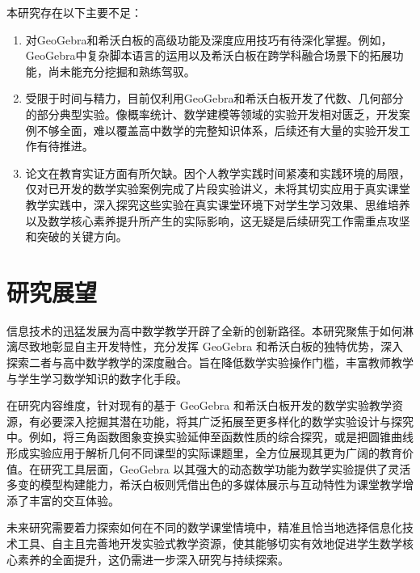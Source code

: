 本研究存在以下主要不足：
\begin{enumerate}[(1)]
  \item 对GeoGebra和希沃白板的高级功能及深度应用技巧有待深化掌握。例如，GeoGebra中复杂脚本语言的运用以及希沃白板在跨学科融合场景下的拓展功能，尚未能充分挖掘和熟练驾驭。
  \item 受限于时间与精力，目前仅利用GeoGebra和希沃白板开发了代数、几何部分的部分典型实验。像概率统计、数学建模等领域的实验开发相对匮乏，开发案例不够全面，难以覆盖高中数学的完整知识体系，后续还有大量的实验开发工作有待推进。
  \item 论文在教育实证方面有所欠缺。因个人教学实践时间紧凑和实践环境的局限，仅对已开发的数学实验案例完成了片段实验讲义，未将其切实应用于真实课堂教学实践中，深入探究这些实验在真实课堂环境下对学生学习效果、思维培养以及数学核心素养提升所产生的实际影响，这无疑是后续研究工作需重点攻坚和突破的关键方向。
\end{enumerate}


\section{研究展望}

信息技术的迅猛发展为高中数学教学开辟了全新的创新路径。本研究聚焦于如何淋漓尽致地彰显自主开发特性，充分发挥 GeoGebra 和希沃白板的独特优势，深入探索二者与高中数学教学的深度融合。旨在降低数学实验操作门槛，丰富教师教学与学生学习数学知识的数字化手段。​

在研究内容维度，针对现有的基于 GeoGebra 和希沃白板开发的数学实验教学资源，有必要深入挖掘其潜在功能，将其广泛拓展至更多样化的数学实验设计与探究中。例如，将三角函数图象变换实验延伸至函数性质的综合探究，或是把圆锥曲线形成实验应用于解析几何不同课型的实际课题里，全方位展现其更为广阔的教育价值。在研究工具层面，GeoGebra 以其强大的动态数学功能为数学实验提供了灵活多变的模型构建能力，希沃白板则凭借出色的多媒体展示与互动特性为课堂教学增添了丰富的交互体验。

未来研究需要着力探索如何在不同的数学课堂情境中，精准且恰当地选择信息化技术工具、自主且完善地开发实验式教学资源，使其能够切实有效地促进学生数学核心素养的全面提升，这仍需进一步深入研究与持续探索。